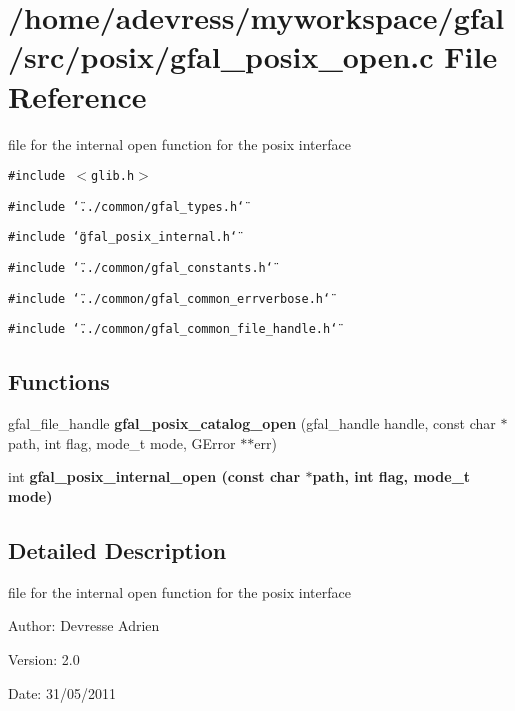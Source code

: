 \section{/home/adevress/myworkspace/gfal/src/posix/gfal\_\-posix\_\-open.c File Reference}
\label{gfal__posix__open_8c}
file for the internal open function for the posix interface 

{\tt \#include $<$glib.h$>$}\par
{\tt \#include \char`\"{}../common/gfal\_\-types.h\char`\"{}}\par
{\tt \#include \char`\"{}gfal\_\-posix\_\-internal.h\char`\"{}}\par
{\tt \#include \char`\"{}../common/gfal\_\-constants.h\char`\"{}}\par
{\tt \#include \char`\"{}../common/gfal\_\-common\_\-errverbose.h\char`\"{}}\par
{\tt \#include \char`\"{}../common/gfal\_\-common\_\-file\_\-handle.h\char`\"{}}\par
\subsection*{Functions}
\begin{CompactItemize}
\item 
gfal\_\-file\_\-handle \textbf{gfal\_\-posix\_\-catalog\_\-open} (gfal\_\-handle handle, const char $\ast$path, int flag, mode\_\-t mode, GError $\ast$$\ast$err)\label{gfal__posix__open_8c_26019b1a84c6ab6694296705ddaf453b}

\item 
int \bf{gfal\_\-posix\_\-internal\_\-open} (const char $\ast$path, int flag, mode\_\-t mode)
\end{CompactItemize}


\subsection{Detailed Description}
file for the internal open function for the posix interface 

\begin{Desc}
\item[Author:]Devresse Adrien \end{Desc}
\begin{Desc}
\item[Version:]2.0 \end{Desc}
\begin{Desc}
\item[Date:]31/05/2011 \end{Desc}


